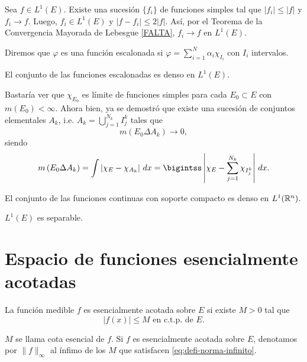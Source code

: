 \begin{demo}
Sea $f\in L^1(E)$. Existe una sucesi\'on $\{f_i\}$ de funciones simples tal que $|f_i|\leq |f|$ y $f_i \to f$. Luego, $f_i \in L^1(E)$ y $|f-f_i|\leq 2|f|$. As\'i, por el Teorema de la Convergencia Mayorada de Lebesgue \ref{FALTA}, $f_i \to f$ en $L^1(E)$.
\end{demo}

\begin{definicion}{}
Diremos que $\varphi$ es una funci\'on escalonada si 
$\varphi=\sum\limits_{i=1}^N \alpha_i \chi_{I_i}$
con $I_i$ intervalos.
\end{definicion}

\begin{teorema}{}
El conjunto de las funciones escalonadas es denso en $L^1(E)$.
\end{teorema}

\begin{demo}
Bastar\'ia ver que $\chi_{E_0}$ es l\'imite de funciones simples para cada $E_0\subset E$ con $m(E_0)<\infty$.
Ahora bien, ya se demostr\'o que existe una sucesi\'on  de conjuntos elementales $A_k$, i.e. $A_k=\bigcup\limits_{j=1}^{N_k} I_j^k$ tales que 
\[
m\left(E_0\Delta A_k\right) \to 0,
\]
siendo
\[
m\left(E_0\Delta A_k\right)=
\int \left|\chi_E-\chi_{A_k}\right|\,dx=
\bigintss \left|
\chi_E-\sum\limits_{j=1}^{N_k} \chi_{I_j^k}
\right|\,dx.
\]
\end{demo}

\begin{ejercicio}{}
El conjunto de las funciones continuas con soporte compacto es denso en $L^1(\mathbb{R}^n)$.
\end{ejercicio}

\begin{ejercicio}{}
$L^1(E)$ es separable.
\end{ejercicio}

\section{Espacio de funciones esencialmente acotadas}

La función medible $f$ es esencialmente acotada sobre $E$ si existe $M>0$ tal que
\begin{equation}\label{eq:defi-norma-infinito}
|f(x)|\leq M \mbox { en c.t.p. de  } E.
\end{equation}

$M$ se llama cota esencial de $f$.  Si $f$ es esencialmente acotada sobre $E$, denotamos por $\|f\|_{\infty}$ al \'infimo de los $M$ que satisfacen \eqref{eq:defi-norma-infinito}.

